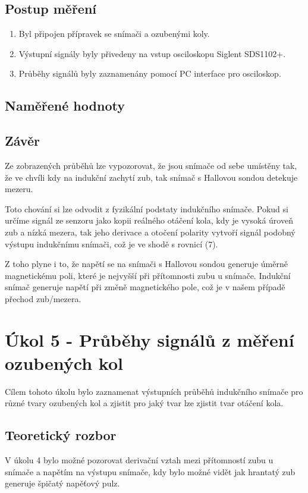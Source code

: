 \documentclass{protokol}
\begin{document}
    \subsection{Postup měření}
        \begin{enumerate}
            \item Byl připojen přípravek se snímači a ozubenými koly.
            \item Výstupní signály byly přivedeny na vstup osciloskopu Siglent SDS1102+.
            \item Průběhy signálů byly zaznamenány pomocí PC interface pro osciloskop.
        \end{enumerate}
        
    \pagebreak
    \subsection{Naměřené hodnoty}

    \subsection{Závěr}
        Ze zobrazených průběhů lze vypozorovat, že jsou snímače od sebe umístěny tak, že ve chvíli kdy na indukční zachytí zub, tak snímač s Hallovou sondou detekuje mezeru.

        Toto chování si lze odvodit z fyzikální podstaty indukčního snímače. Pokud si určíme signál ze senzoru jako kopii reálného otáčení kola, kdy je vysoká úroveň zub a nízká mezera, tak jeho derivace a otočení polarity vytvoří signál podobný výstupu indukčnímu snímači, což je ve shodě s rovnicí (7).

        Z toho plyne i to, že napětí se na snímači s Hallovou sondou generuje úměrně magnetickému poli, které je nejvyšší při přítomnosti zubu u snímače. Indukční snímač generuje napětí při změně magnetického pole, což je v našem případě přechod zub/mezera.

\pagebreak

\section{Úkol 5 - Průběhy signálů z měření ozubených kol}
    Cílem tohoto úkolu bylo zaznamenat výstupních průběhů indukčního snímače pro různé tvary ozubených kol a zjistit pro jaký tvar lze zjistit tvar otáčení kola.
    \subsection{Teoretický rozbor}
        V úkolu 4 bylo možné pozorovat derivační vztah mezi přítomností zubu u snímače a napětím na výstupu snímače, kdy bylo možné vidět jak hrantatý zub generuje špičatý napěťový pulz.
\end{document}
